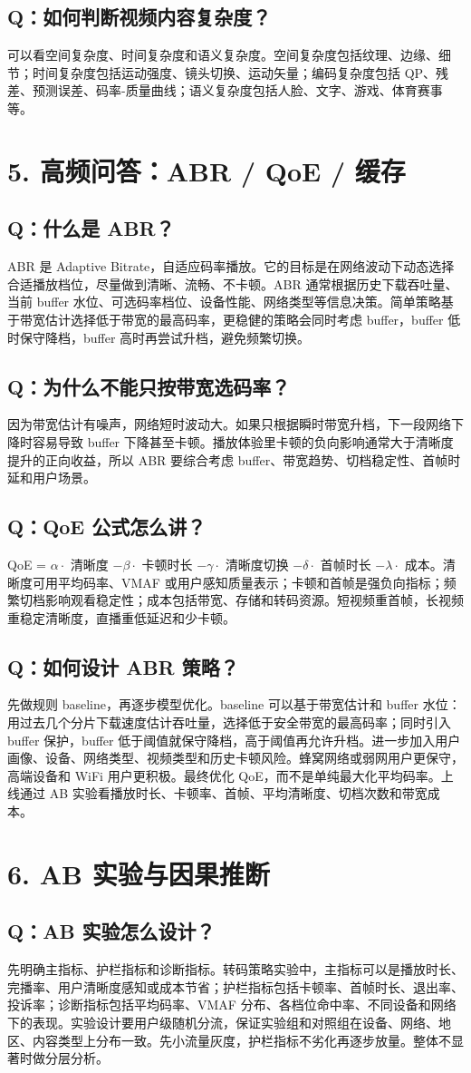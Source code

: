 ﻿\documentclass[11pt,a4paper]{ctexart}
\newcommand{\qa}[2]{\subsection*{Q：#1}\begin{answerbox}#2\end{answerbox}}
\begin{document}
\qa{如何判断视频内容复杂度？}{可以看空间复杂度、时间复杂度和语义复杂度。空间复杂度包括纹理、边缘、细节；时间复杂度包括运动强度、镜头切换、运动矢量；编码复杂度包括 QP、残差、预测误差、码率-质量曲线；语义复杂度包括人脸、文字、游戏、体育赛事等。}

\section{5. 高频问答：ABR / QoE / 缓存}

\qa{什么是 ABR？}{ABR 是 Adaptive Bitrate，自适应码率播放。它的目标是在网络波动下动态选择合适播放档位，尽量做到清晰、流畅、不卡顿。ABR 通常根据历史下载吞吐量、当前 buffer 水位、可选码率档位、设备性能、网络类型等信息决策。简单策略基于带宽估计选择低于带宽的最高码率，更稳健的策略会同时考虑 buffer，buffer 低时保守降档，buffer 高时再尝试升档，避免频繁切换。}

\qa{为什么不能只按带宽选码率？}{因为带宽估计有噪声，网络短时波动大。如果只根据瞬时带宽升档，下一段网络下降时容易导致 buffer 下降甚至卡顿。播放体验里卡顿的负向影响通常大于清晰度提升的正向收益，所以 ABR 要综合考虑 buffer、带宽趋势、切档稳定性、首帧时延和用户场景。}

\qa{QoE 公式怎么讲？}{QoE = $\alpha \cdot$ 清晰度 $- \beta \cdot$ 卡顿时长 $- \gamma \cdot$ 清晰度切换 $- \delta \cdot$ 首帧时长 $- \lambda \cdot$ 成本。清晰度可用平均码率、VMAF 或用户感知质量表示；卡顿和首帧是强负向指标；频繁切档影响观看稳定性；成本包括带宽、存储和转码资源。短视频重首帧，长视频重稳定清晰度，直播重低延迟和少卡顿。}

\qa{如何设计 ABR 策略？}{先做规则 baseline，再逐步模型优化。baseline 可以基于带宽估计和 buffer 水位：用过去几个分片下载速度估计吞吐量，选择低于安全带宽的最高码率；同时引入 buffer 保护，buffer 低于阈值就保守降档，高于阈值再允许升档。进一步加入用户画像、设备、网络类型、视频类型和历史卡顿风险。蜂窝网络或弱网用户更保守，高端设备和 WiFi 用户更积极。最终优化 QoE，而不是单纯最大化平均码率。上线通过 AB 实验看播放时长、卡顿率、首帧、平均清晰度、切档次数和带宽成本。}

\newpage
\section{6. AB 实验与因果推断}

\qa{AB 实验怎么设计？}{先明确主指标、护栏指标和诊断指标。转码策略实验中，主指标可以是播放时长、完播率、用户清晰度感知或成本节省；护栏指标包括卡顿率、首帧时长、退出率、投诉率；诊断指标包括平均码率、VMAF 分布、各档位命中率、不同设备和网络下的表现。实验设计要用户级随机分流，保证实验组和对照组在设备、网络、地区、内容类型上分布一致。先小流量灰度，护栏指标不劣化再逐步放量。整体不显著时做分层分析。}
\end{document}
